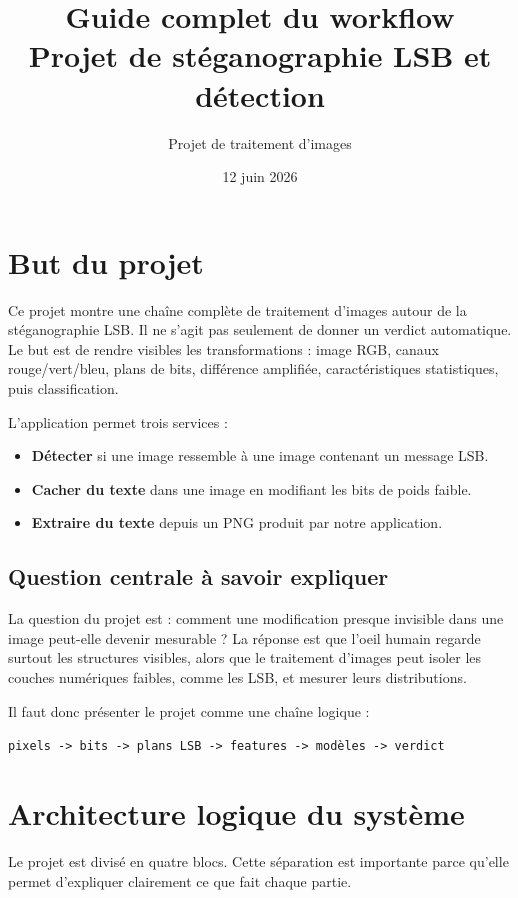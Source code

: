 \documentclass[11pt,a4paper]{article}
\title{\textbf{Guide complet du workflow}\\Projet de stéganographie LSB et détection}
\author{Projet de traitement d'images}
\date{12 juin 2026}
\begin{document}
\maketitle
\tableofcontents
\newpage

\section{But du projet}
Ce projet montre une chaîne complète de traitement d'images autour de la stéganographie LSB. Il ne s'agit pas seulement de donner un verdict automatique. Le but est de rendre visibles les transformations : image RGB, canaux rouge/vert/bleu, plans de bits, différence amplifiée, caractéristiques statistiques, puis classification.

L'application permet trois services :
\begin{itemize}
  \item \textbf{Détecter} si une image ressemble à une image contenant un message LSB.
  \item \textbf{Cacher du texte} dans une image en modifiant les bits de poids faible.
  \item \textbf{Extraire du texte} depuis un PNG produit par notre application.
\end{itemize}

\subsection*{Question centrale à savoir expliquer}
La question du projet est : comment une modification presque invisible dans une image peut-elle devenir mesurable ? La réponse est que l'oeil humain regarde surtout les structures visibles, alors que le traitement d'images peut isoler les couches numériques faibles, comme les LSB, et mesurer leurs distributions.

Il faut donc présenter le projet comme une chaîne logique :
\begin{center}
\texttt{pixels -> bits -> plans LSB -> features -> modèles -> verdict}
\end{center}

\section{Architecture logique du système}
Le projet est divisé en quatre blocs. Cette séparation est importante parce qu'elle permet d'expliquer clairement ce que fait chaque partie.
\end{document}
